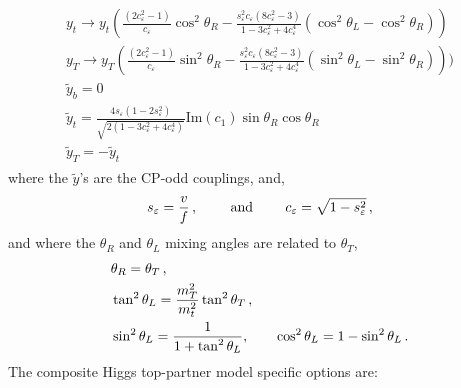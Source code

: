 \documentclass[12pt,a4wide]{article}
\begin{document}
\begin{eqnarray}
\begin{array}{l}
		y_t \rightarrow y_t \left ( \frac{(2 c_\varepsilon^2 - 1)}{c_\varepsilon} \cos^2\theta_R - \frac{s_\varepsilon^2 c_\varepsilon (8 c_\varepsilon^2 - 3)}{1 - 3 c_\varepsilon^2 + 4 c_\varepsilon^4} \left ( \cos^2\theta_L - \cos^2\theta_R \right ) \right ) \\ 
		y_T \rightarrow y_T \left ( \frac{(2 c_\varepsilon^2 - 1)}{c_\varepsilon} \sin^2\theta_R - \frac{s_\varepsilon^2 c_\varepsilon (8 c_\varepsilon^2 - 3)}{1 - 3 c_\varepsilon^2 + 4 c_\varepsilon^4} \left ( \sin^2\theta_L - \sin^2\theta_R \right ) \right )) \\ 
		\tilde{y}_b = 0 \\
		\tilde{y}_t = \frac{4 s_\varepsilon (1 - 2 s_\varepsilon^2)}{\sqrt{2(1 - 3 c_\varepsilon^2 + 4 c_\varepsilon^4)}} \text{Im}(c_1) \sin\theta_R \cos\theta_R \\ 
		\tilde{y}_T = -\tilde{y}_t 
	\end{array}
\end{eqnarray}
where the $\tilde{y}$'s are the CP-odd couplings, and, 
\begin{equation}
	s_\varepsilon = \frac{v}{f} \,, \hspace{7 mm} \text{ and } \hspace{7 mm} c_\varepsilon = \sqrt{1 - s_\varepsilon^2} \,,
\end{equation}
and where the $\theta_R$ and $\theta_L$ mixing angles are related to $\theta_T$, 
\begin{eqnarray}
	& \theta_R = \theta_T \,, \nonumber \\ 
	& \tan^2\theta_L = \frac{m_T^2}{m_t^2} \tan^2\theta_T \,, \\ 
	& \sin^2\theta_L = \frac{1}{1 + \tan^2\theta_L}, \hspace{7 mm} \cos^2\theta_L = 1 - \sin^2\theta_L \,. \nonumber  
\end{eqnarray}
The composite Higgs top-partner model specific options are: 
\end{document}
